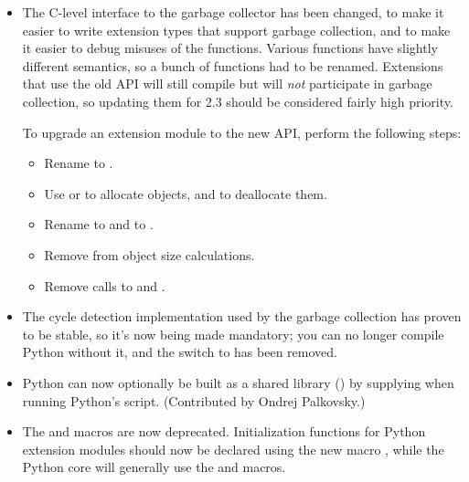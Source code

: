 \documentclass{howto}
\begin{document}
\begin{itemize}

\item The C-level interface to the garbage collector has been changed,
to make it easier to write extension types that support garbage
collection, and to make it easier to debug misuses of the functions.
Various functions have slightly different semantics, so a bunch of
functions had to be renamed.  Extensions that use the old API will
still compile but will \emph{not} participate in garbage collection,
so updating them for 2.3 should be considered fairly high priority.

To upgrade an extension module to the new API, perform the following
steps:

\begin{itemize}

\item Rename  to .

\item Use  or  to
allocate objects, and  to deallocate them.

\item Rename  to  and
 to .

\item Remove  from object size calculations.

\item Remove calls to  and .

\end{itemize}

\item The cycle detection implementation used by the garbage collection
has proven to be stable, so it's now being made mandatory; you can no
longer compile Python without it, and the
 switch to  has been removed.

\item Python can now optionally be built as a shared library
() by supplying 
when running Python's  script.  (Contributed by Ondrej
Palkovsky.)

\item The  and  macros
are now deprecated.  Initialization functions for Python extension
modules should now be declared using the new macro
, while the Python core will generally
use the  and 
macros.


\end{itemize}
\end{document}
